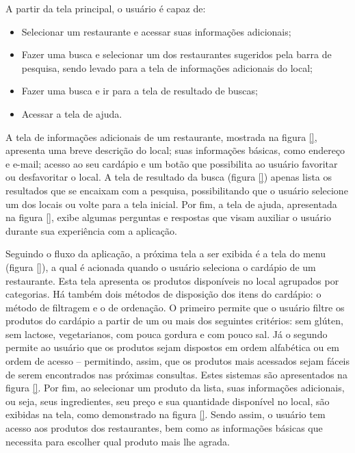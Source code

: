 A partir da tela principal, o usuário é capaz de:
\begin{itemize}
	\item Selecionar um restaurante e acessar suas informações adicionais;
	\item Fazer uma busca e selecionar um dos restaurantes sugeridos pela barra de pesquisa, sendo levado para a tela de informações adicionais do local;
	\item Fazer uma busca e ir para a tela de resultado de buscas;
	\item Acessar a tela de ajuda.
\end{itemize}
A tela de informações adicionais de um restaurante, mostrada na figura \ref{}, apresenta uma breve descrição do local; suas informações básicas, como endereço e e-mail; acesso ao seu cardápio e um botão que possibilita ao usuário favoritar ou desfavoritar o local. A tela de resultado da busca (figura \ref{}) apenas lista os resultados que se encaixam com a pesquisa, possibilitando que o usuário selecione um dos locais ou volte para a tela inicial. Por fim, a tela de ajuda, apresentada na figura \ref{}, exibe algumas perguntas e respostas que visam auxiliar o usuário durante sua experiência com a aplicação.

Seguindo o fluxo da aplicação, a próxima tela a ser exibida é a tela do menu (figura \ref{}), a qual é acionada quando o usuário seleciona o cardápio de um restaurante. Esta tela apresenta os produtos disponíveis no local agrupados por categorias. Há também dois métodos de disposição dos itens do cardápio: o método de filtragem e o de ordenação. O primeiro permite que o usuário filtre os produtos do cardápio a partir de um ou mais dos seguintes critérios: sem glúten, sem lactose, vegetarianos, com pouca gordura e com pouco sal. Já o segundo permite ao usuário que os produtos sejam dispostos em ordem alfabética ou em ordem de acesso -- permitindo, assim, que os produtos mais acessados sejam fáceis de serem encontrados nas próximas consultas. Estes sistemas são apresentados na figura \ref{}. Por fim, ao selecionar um produto da lista, suas informações adicionais, ou seja, seus ingredientes, seu preço e sua quantidade disponível no local, são exibidas na tela, como demonstrado na figura \ref{}. Sendo assim, o usuário tem acesso aos produtos dos restaurantes, bem como as informações básicas que necessita para escolher qual produto mais lhe agrada.
